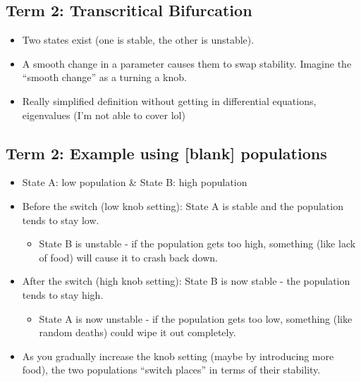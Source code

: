 \documentclass[
  letterpaper,
  DIV=11,
  numbers=noendperiod]{scrartcl}
\providecommand{\tightlist}{%
  \setlength{\itemsep}{0pt}\setlength{\parskip}{0pt}}\usepackage{longtable,booktabs,array}
\begin{document}
\subsection{Term 2: Transcritical
Bifurcation}\label{term-2-transcritical-bifurcation}

\begin{itemize}
\item
  Two states exist (one is stable, the other is unstable).
\item
  A smooth change in a parameter causes them to swap stability. Imagine
  the ``smooth change'' as a turning a knob.
\item
  Really simplified definition without getting in differential
  equations, eigenvalues (I'm not able to cover lol)
\end{itemize}

\subsection{Term 2: Example using {[}blank{]}
populations}\label{term-2-example-using-blank-populations}

\begin{itemize}
\tightlist
\item
  State A: low population \& State B: high population
\item
  Before the switch (low knob setting): State A is stable and the
  population tends to stay low.

  \begin{itemize}
  \tightlist
  \item
    State B is unstable - if the population gets too high, something
    (like lack of food) will cause it to crash back down.
  \end{itemize}
\item
  After the switch (high knob setting): State B is now stable - the
  population tends to stay high.

  \begin{itemize}
  \tightlist
  \item
    State A is now unstable - if the population gets too low, something
    (like random deaths) could wipe it out completely.
  \end{itemize}
\item
  As you gradually increase the knob setting (maybe by introducing more
  food), the two populations ``switch places'' in terms of their
  stability.
\end{itemize}
\end{document}

